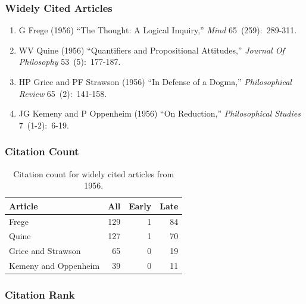 \documentclass[
  10pt,
  letterpaper,
  DIV=11,
  numbers=noendperiod,
  twoside]{scrartcl}
\providecommand{\tightlist}{%
  \setlength{\itemsep}{0pt}\setlength{\parskip}{0pt}}\usepackage{longtable,booktabs,array}
\begin{document}
\subsubsection*{Widely Cited Articles}\label{widely-cited-articles}

\begin{enumerate}
\def\labelenumi{\arabic{enumi}.}
\tightlist
\item
  G Frege (1956) ``The Thought: A Logical Inquiry,'' \emph{Mind}
  65~(259):~289-311.
\item
  WV Quine (1956) ``Quantifiers and Propositional Attitudes,''
  \emph{Journal Of Philosophy} 53~(5):~177-187.
\item
  HP Grice and PF Strawson (1956) ``In Defense of a Dogma,''
  \emph{Philosophical Review} 65~(2):~141-158.
\item
  JG Kemeny and P Oppenheim (1956) ``On Reduction,'' \emph{Philosophical
  Studies} 7~(1-2):~6-19.
\end{enumerate}

\subsubsection*{Citation Count}\label{sec-count-1956}

\begin{longtable}[]{@{}lrrr@{}}

\caption{\label{tbl-citation-count-1956}Citation count for widely cited
articles from 1956.}

\tabularnewline

\toprule\noalign{}
Article & All & Early & Late \\
\midrule\noalign{}
\endhead
\bottomrule\noalign{}
\endlastfoot
Frege & 129 & 1 & 84 \\
Quine & 127 & 1 & 70 \\
Grice and Strawson & 65 & 0 & 19 \\
Kemeny and Oppenheim & 39 & 0 & 11 \\

\end{longtable}

\subsubsection*{Citation Rank}\label{sec-rank-1956}
\end{document}
